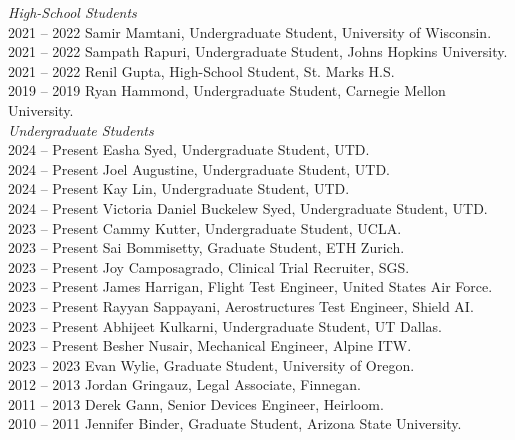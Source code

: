 
\textit{High-School Students} \\
2021 -- 2022 \hspace{28pt} Samir Mamtani, Undergraduate Student, University of Wisconsin. \\
2021 -- 2022 \hspace{28pt} Sampath Rapuri, Undergraduate Student, Johns Hopkins University. \\
2021 -- 2022 \hspace{28pt} Renil Gupta, High-School Student, St. Marks H.S. \\
2019 -- 2019 \hspace{28pt} Ryan Hammond, Undergraduate Student, Carnegie Mellon University. \\

\textit{Undergraduate Students} \\
2024 -- Present \hspace{14pt} Easha Syed, Undergraduate Student, UTD. \\
2024 -- Present \hspace{14pt} Joel Augustine, Undergraduate Student, UTD. \\
2024 -- Present \hspace{14pt} Kay Lin, Undergraduate Student, UTD. \\
2024 -- Present \hspace{14pt} Victoria Daniel Buckelew Syed, Undergraduate Student, UTD. \\
2023 -- Present \hspace{14pt} Cammy Kutter, Undergraduate Student, UCLA. \\
2023 -- Present \hspace{14pt} Sai Bommisetty, Graduate Student, ETH Zurich. \\
2023 -- Present \hspace{14pt} Joy Camposagrado, Clinical Trial Recruiter, SGS. \\
2023 -- Present \hspace{14pt} James Harrigan, Flight Test Engineer, United States Air Force. \\
2023 -- Present \hspace{14pt} Rayyan Sappayani, Aerostructures Test Engineer, Shield AI. \\
2023 -- Present \hspace{14pt} Abhijeet Kulkarni, Undergraduate Student, UT Dallas. \\
2023 -- Present \hspace{14pt} Besher Nusair, Mechanical Engineer, Alpine ITW. \\
2023 -- 2023 \hspace{28pt} Evan Wylie, Graduate Student, University of Oregon. \\
2012 -- 2013 \hspace{28pt} Jordan Gringauz, Legal Associate, Finnegan. \\
2011 -- 2013 \hspace{28pt} Derek Gann, Senior Devices Engineer, Heirloom. \\
2010 -- 2011 \hspace{28pt} Jennifer Binder, Graduate Student, Arizona State University. \\

